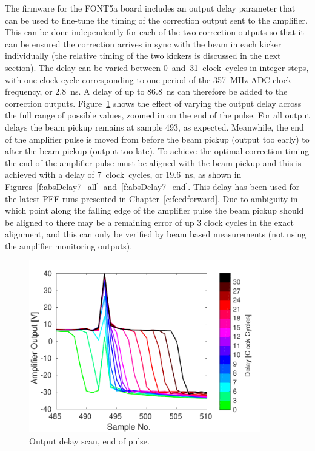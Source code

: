 The firmware for the FONT5a board includes an output delay parameter that can be used to fine-tune the timing of the correction output sent to the amplifier. This can be done independently for each of the two correction outputs so that it can be ensured the correction arrives in sync with the beam in each kicker individually (the relative timing of the two kickers is discussed in the next section). The delay can be varied between 0~and~31~clock~cycles in integer steps, with one clock cycle corresponding to one period of the 357~MHz ADC clock frequency, or 2.8~ns. A delay of up to 86.8~ns can therefore be added to the correction outputs. Figure~\ref{f:absDelayAll_endPulse} shows the effect of varying the output delay across the full range of possible values, zoomed in on the end of the pulse. For all output delays the beam pickup remains at sample 493, as expected. Meanwhile, the end of the amplifier pulse is moved from before the beam pickup (output too early) to after the beam pickup (output too late). To achieve the optimal correction timing the end of the amplifier pulse must be aligned with the beam pickup and this is achieved with a delay of 7~clock~cycles, or 19.6~ns, as shown in Figures~\ref{f:absDelay7_all}~and~\ref{f:absDelay7_end}. This delay has been used for the latest PFF runs presented in Chapter~\ref{c:feedforward}. Due to ambiguity in which point along the falling edge of the amplifier pulse the beam pickup should be aligned to there may be a remaining error of up 3 clock cycles in the exact alignment, and this can only be verified by beam based measurements (not using the amplifier monitoring outputs). 

\begin{figure}
  \centering
  \includegraphics[width=0.9\textwidth]{Figures/commissioning/absDelayAll_endPulse}
  \caption{Output delay scan, end of pulse.}
  \label{f:absDelayAll_endPulse}
\end{figure}


